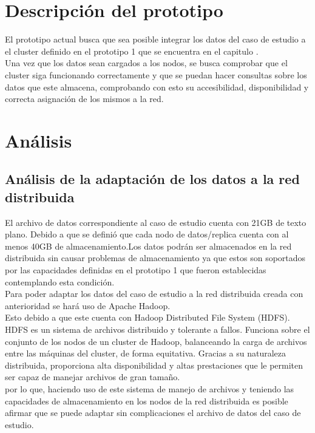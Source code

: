 \section{Descripción del prototipo}
El prototipo actual busca que sea posible integrar los datos del caso de estudio a el cluster definido en el prototipo 1 que se encuentra en el capitulo .
\\
Una vez que los datos sean cargados a los nodos, se busca comprobar que el cluster siga funcionando correctamente y que se puedan hacer consultas sobre los datos que este almacena, comprobando con esto su accesibilidad, disponibilidad y correcta asignación de los mismos a la red.
\section{Análisis}
\subsection{Análisis de la adaptación de los datos a la red distribuida}
El archivo de datos correspondiente al caso de estudio cuenta con 21GB de texto plano. Debido a que se definió que cada nodo de datos/replica cuenta con al menos 40GB de almacenamiento.Los datos podrán ser almacenados en la red distribuida sin causar problemas de almacenamiento ya que estos son soportados por las capacidades definidas en el prototipo 1 que fueron establecidas contemplando esta condición.
\\
Para poder adaptar los datos del caso de estudio a la red distribuida creada con anterioridad se hará uso de Apache Hadoop. 
\\
Esto debido a que este cuenta con Hadoop Distributed File System (HDFS). HDFS  es  un  sistema  de  archivos  distribuido  y  tolerante  a  fallos. Funciona  sobre  el  
conjunto  de  los  nodos  de  un  cluster  de  Hadoop,  balanceando  la  carga  de  archivos   entre   las   máquinas   del   cluster,   de   forma   equitativa.   Gracias   a   su   
naturaleza  distribuida,  proporciona  alta  disponibilidad  y  altas  prestaciones  que  le  permiten ser capaz de manejar archivos de gran tamaño.
\\
por lo que, haciendo uso de este sistema de manejo de archivos y teniendo las capacidades de almacenamiento en los nodos de la red distribuida es posible afirmar que se puede adaptar sin complicaciones el archivo de datos del caso de estudio.

